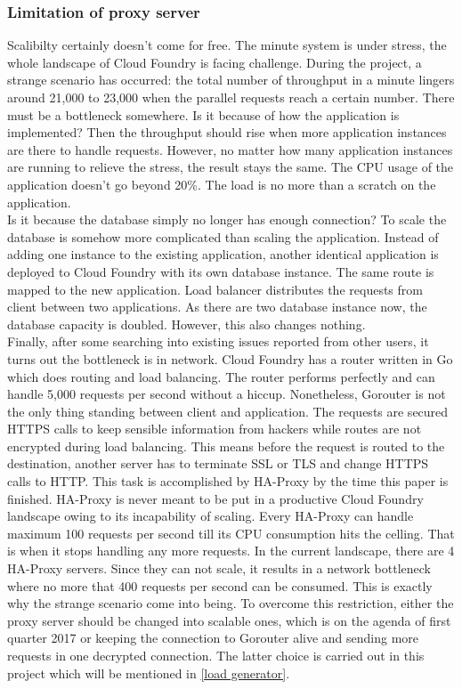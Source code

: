  \subsubsection{Limitation of proxy server}
Scalibilty certainly doesn't come for free. The minute system is under stress, the whole landscape of Cloud Foundry is facing challenge. During the project, a strange scenario has occurred: the total number of throughput in a minute lingers around 21,000 to 23,000 when the parallel requests reach a certain number. There must be a bottleneck somewhere. Is it because of how the application is implemented? Then the throughput should rise when more application instances are there to handle requests. However, no matter how many application instances are running to relieve the stress, the result stays the same.  The CPU usage of the application doesn't go beyond 20\%. The load is no more than a scratch on the application.\\
Is it because the database simply no longer has enough connection? To scale the database is somehow more complicated than scaling the application. Instead of adding one instance to the existing application, another identical application is deployed to Cloud Foundry with its own database instance. The same route is mapped to the new application. Load balancer distributes the requests from client between two applications. As there are two database instance now, the database capacity is doubled. However, this also changes nothing.\\ 
Finally, after some searching into existing issues reported from other users, it turns out the bottleneck is in network. Cloud Foundry has a router written in Go which does routing and load balancing. The router performs perfectly and can handle 5,000 requests per second without a hiccup. Nonetheless, Gorouter is not the only thing standing between client and application. The requests are secured HTTPS calls to keep sensible information from hackers while routes are not encrypted during load balancing. This means before the request is routed to the destination, another server has to terminate SSL or TLS and change HTTPS calls to HTTP. This task is accomplished by HA-Proxy by the time this paper is finished. HA-Proxy is never meant to be put in a productive Cloud Foundry landscape owing to its incapability of scaling. Every HA-Proxy can handle maximum 100 requests per second till its CPU consumption hits the celling. That is when it stops handling any more requests. In the current landscape, there are 4 HA-Proxy servers. Since they can not scale, it results in a network bottleneck where no more that 400 requests per second can be consumed. This is exactly why the strange scenario come into being. To overcome this restriction, either the proxy server should be changed into scalable ones, which is on the agenda of first quarter 2017 or keeping the connection to Gorouter alive and sending more requests in one decrypted connection. The latter choice is carried out in this project which will be mentioned in \ref{load generator}.


